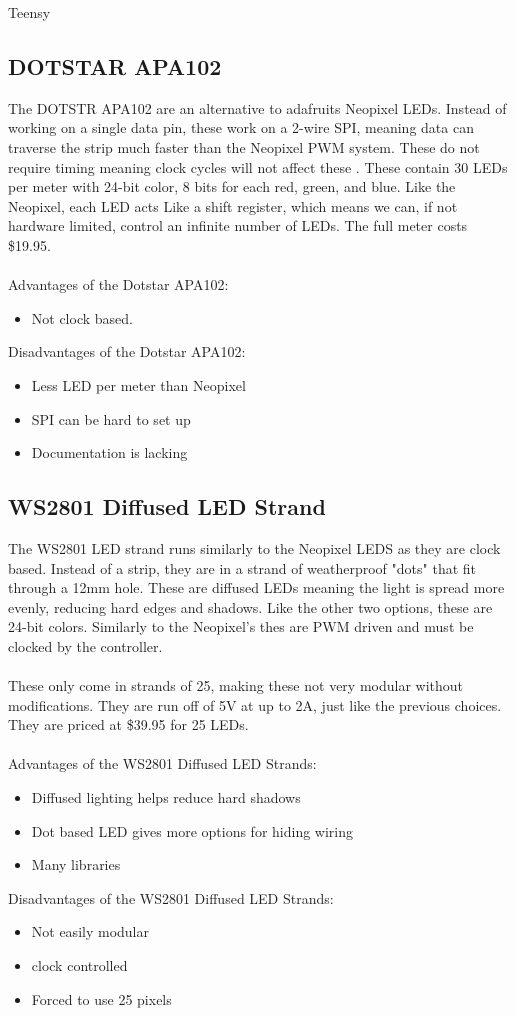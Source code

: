 Teensy\documentclass[onecolumn, draftclsnofoot,10pt, compsoc]{IEEEtran}
\begin{document}
		\subsection{DOTSTAR APA102}
		The DOTSTR APA102 are an alternative to adafruits Neopixel LEDs. Instead
		of working on a single data pin, these work on a 2-wire SPI, meaning data
		can traverse the strip much faster than the Neopixel PWM system. These do
		not require timing meaning clock cycles will not affect these
		\cite[Pg2]{dotstar}. These contain 30 LEDs per meter with 24-bit color,
		8 bits for each red, green, and blue. Like the Neopixel, each LED acts Like
		a shift register, which means we can, if not hardware limited, control an
		infinite number of LEDs. The full meter costs \$19.95.
		\\\\
		Advantages of the Dotstar APA102:
		\begin{itemize}
			\item Not clock based.
		\end{itemize}
		Disadvantages of the Dotstar APA102:
		\begin{itemize}
			\item Less LED per meter than Neopixel
			\item SPI can be hard to set up
			\item Documentation is lacking
		\end{itemize}
		\subsection{WS2801 Diffused LED Strand}
		The WS2801 LED strand runs similarly to the Neopixel LEDS as they are clock
		based. Instead of a strip, they are in a strand of weatherproof "dots"
		that fit through a 12mm hole\cite[Pg 2]{strand}. These are diffused LEDs
		meaning the light is spread more evenly, reducing hard edges and shadows.
		Like the other two options, these are 24-bit colors. Similarly to the
		Neopixel's thes are PWM driven and must be clocked by the controller.
		\\\\
		These only come in strands of 25, making these not very modular without
		modifications. They are run off of 5V at up to 2A, just like the previous
		choices. They are priced at \$39.95 for 25 LEDs.
		\\\\
		Advantages of the WS2801 Diffused LED Strands:
		\begin{itemize}
			\item Diffused lighting helps reduce hard shadows
			\item Dot based LED gives more options for hiding wiring
			\item Many libraries
		\end{itemize}
		Disadvantages of the WS2801 Diffused LED Strands:
		\begin{itemize}
			\item Not easily modular
			\item clock controlled
			\item Forced to use 25 pixels
		\end{itemize}
\end{document}
